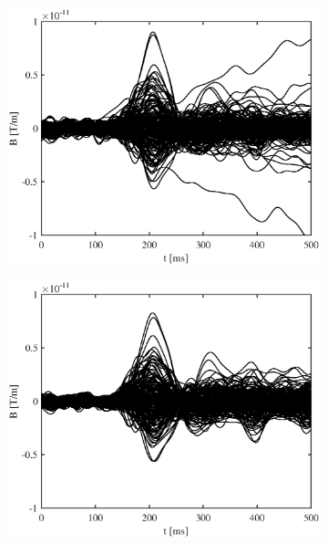 \documentclass[doc,a4paper,12pt]{apa6}
\begin{document}
\begin{figure}
  \centering
  \captionsetup{justification=centering}
  \begin{subfigure}[c]{0.36\textwidth}
    \includegraphics[width=\textwidth]{ergebnisse/butterfly/pa07a1_eve2_raw_grad_butterfly.eps}
    \label{img:butterfly:grad:raw:pa07}
  \end{subfigure}\hspace*{0.08\textwidth}
  \begin{subfigure}[c]{0.36\textwidth}
    \includegraphics[width=\textwidth]{ergebnisse/butterfly/pa07a1_eve2_sss_grad_butterfly.eps}

\end{subfigure}
\end{figure}
\end{document}
